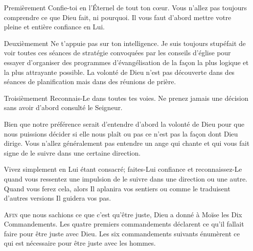 Premièrement\frcolon{} \Og Confie-toi en l'Éternel de tout ton c\oe{}ur. \Fg{}
 Vous n'allez pas toujours comprendre ce que Dieu fait, ni pourquoi.
 Il vous faut d'abord mettre votre pleine et entière confiance en Lui. 

Deuxièmement\frcolon{} \Og Ne t'appuie pas sur ton intelligence. \Fg{}
 Je suis toujours stupéfait de voir toutes ces séances de stratégie
 convoquées par les conseils d'église pour essayer d'organiser
 des programmes d'évangélisation de la fa\c{c}on la plus logique
 et la plus attrayante possible.
 La volonté de Dieu n'est pas découverte dans des séances
 de planification mais dans des réunions de prière. 

Troisièmement\frcolon{} \Og Reconnais-Le dans toutes tes voies. \Fg{}
 Ne prenez jamais une décision sans avoir d'abord consulté le Seigneur. 


Bien que notre préférence serait d'entendre d'abord la volonté de Dieu
 \ocadr pour que nous puissions décider si elle nous plaît ou pas \Fg{}
 ce n'est pas la fa\c{c}on dont Dieu dirige.
 Vous n'allez généralement pas entendre un ange qui chante
 et qui vous fait signe de le suivre dans une certaine direction. 

Vivez simplement en Lui étant consacré; faites-Lui confiance
 et reconnaissez-Le quand vous ressentez une impulsion de le suivre
 dans une direction ou une autre.
 Quand vous ferez cela, alors \Og Il aplanira vos sentiers \Fg{}
 ou comme le traduisent d'autres versions \Og Il guidera vos pas. \Fg{}

\dvrule






\lettrine{A}{fin} que nous sachions ce que c'est qu'être juste,
 Dieu a donné à Moïse les Dix Commandements.
 Les quatre premiers commandements déclarent ce qu'il fallait faire
 pour être juste avec Dieu.
 Les six commandements suivants énumèrent ce qui est nécessaire
 pour être juste avec les hommes. 

